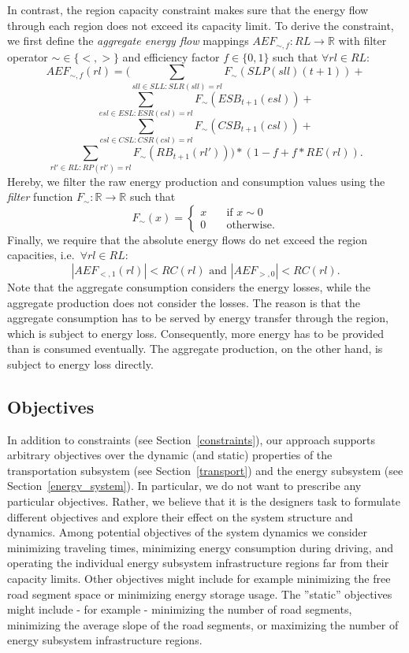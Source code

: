 In contrast, the region capacity constraint makes sure that the energy flow through each region does not exceed its capacity limit. To derive the constraint, we first define the \textit{aggregate energy flow} mappings $AEF_{\sim,f}: RL \rightarrow \mathbb{R}$ with filter operator $\sim \in \{<,>\}$ and efficiency factor $f \in \{0,1\}$ such that $\forall rl \in RL:$
\[
	AEF_{\sim,f}(rl) = (\sum_{sll \in SLL: SLR(sll) = rl} F_\sim(SLP(sll)(t+1)) +
\]
\[
	\sum_{esl \in ESL: ESR(esl) = rl} F_\sim(ESB_{t+1}(esl)) +
\]
\[
	\sum_{csl \in CSL: CSR(csl) = rl} F_\sim(CSB_{t+1}(csl)) +
\]
\[
	\sum_{rl' \in RL: RP(rl') = rl} F_\sim(RB_{t+1}(rl'))) * (1 - f + f * RE(rl)) \textrm{.}
\]
Hereby, we filter the raw energy production and consumption values using the \textit{filter} function $F_\sim: \mathbb{R} \rightarrow \mathbb{R}$ such that
\[
	F_\sim(x) = \begin{cases}
		x & \quad \textrm{if } x \sim 0 \\
		0 & \quad \textrm{otherwise.}
	\end{cases}
\]
Finally, we require that the absolute energy flows do net exceed the region capacities, i.e.\ $\forall rl \in RL:$
\[
	|AEF_{<,1}(rl)| < RC(rl) \textrm{ and } |AEF_{>,0}| < RC(rl) \textrm{.}
\]
Note that the aggregate consumption considers the energy losses, while the aggregate production does not consider the losses. The reason is that the aggregate consumption has to be served by energy transfer through the region, which is subject to energy loss. Consequently, more energy has to be provided than is consumed eventually. The aggregate production, on the other hand, is subject to energy loss directly.

\subsection{Objectives}
\label{objectives}

In addition to constraints (see Section~\ref{constraints}), our approach supports arbitrary objectives over the dynamic (and static) properties of the transportation subsystem (see Section~\ref{transport}) and the energy subsystem (see Section~\ref{energy_system}). In particular, we do not want to prescribe any particular objectives. Rather, we believe that it is the designers task to formulate different objectives and explore their effect on the system structure and dynamics. Among potential objectives of the system dynamics we consider minimizing traveling times, minimizing energy consumption during driving, and operating the individual energy subsystem infrastructure regions far from their capacity limits. Other objectives might include for example minimizing the free road segment space or minimizing energy storage usage. The ''static'' objectives might include - for example - minimizing the number of road segments, minimizing the average slope of the road segments, or maximizing the number of energy subsystem infrastructure regions.